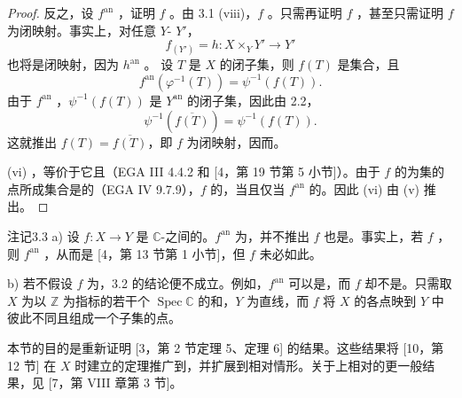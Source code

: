 \begin{proof}
反之，设 $f^{\mathrm{an}}$ ，证明 $f$ 。由 3.1 (viii)，$f$ 。只需再证明 $f$ ，甚至只需证明 $f$ 为闭映射。事实上，对任意 $Y$- $Y'$，
\[
f_{(Y')}=h:X\times_Y Y'\longrightarrow Y'
\]
也将是闭映射，因为 $h^{\mathrm{an}}$ 。
设 $T$ 是 $X$ 的闭子集，则 $f(T)$ 是集合，且
\[
f^{\mathrm{an}}(\varphi^{-1}(T))=\psi^{-1}(f(T)).
\]
由于 $f^{\mathrm{an}}$ ，$\psi^{-1}(f(T))$ 是 $Y^{\mathrm{an}}$ 的闭子集，因此由 2.2，
\[
\psi^{-1}(\overline{f(T)})=\psi^{-1}(f(T)).
\]
这就推出 $f(T)=\overline{f(T)}$，即 $f$ 为闭映射，因而。

(vi) ，等价于它且（EGA III 4.4.2 和 [4，第 19 节第 5 小节]）。由于 $f$ 的为集的点所成集合是的（EGA IV 9.7.9），$f$ 的，当且仅当 $f^{\mathrm{an}}$ 的。因此 (vi) 由 (v) 推出。
\end{proof}

\begin{SGAresult}{注记}{3.3}
a) 设 $f:X\to Y$ 是 $\mathbb C$-之间的。$f^{\mathrm{an}}$ 为，并不推出 $f$ 也是。事实上，若 $f$ ，则 $f^{\mathrm{an}}$ ，从而是 [4，第 13 节第 1 小节]，但 $f$ 未必如此。

b) 若不假设 $f$ 为，3.2 的结论便不成立。例如，$f^{\mathrm{an}}$ 可以是，而 $f$ 却不是。只需取 $X$ 为以 $\mathbb Z$ 为指标的若干个 $\operatorname{Spec}\mathbb C$ 的和，$Y$ 为直线，而 $f$ 将 $X$ 的各点映到 $Y$ 中彼此不同且组成一个子集的点。
\end{SGAresult}

本节的目的是重新证明 [3，第 2 节定理 5、定理 6] 的结果。这些结果将 [10，第 12 节] 在 $X$ 时建立的定理推广到，并扩展到相对情形。关于上相对的更一般结果，见 [7，第 VIII 章第 3 节]。

